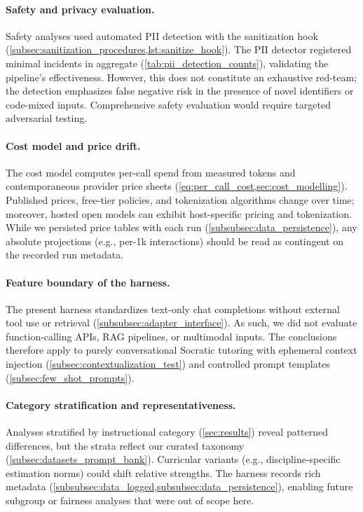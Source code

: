 \paragraph{Safety and privacy evaluation.} Safety analyses used automated PII detection with the sanitization hook (\cref{subsec:sanitization_procedures,lst:sanitize_hook}). The PII detector registered minimal incidents in aggregate (\cref{tab:pii_detection_counts}), validating the pipeline's effectiveness. However, this does not constitute an exhaustive red-team; the detection emphasizes false negative risk in the presence of novel identifiers or code-mixed inputs. Comprehensive safety evaluation would require targeted adversarial testing.

\paragraph{Cost model and price drift.} The cost model computes per-call spend from measured tokens and contemporaneous provider price sheets (\cref{eq:per_call_cost,sec:cost_modelling}). Published prices, free-tier policies, and tokenization algorithms change over time; moreover, hosted open models can exhibit host-specific pricing and tokenization. While we persisted price tables with each run (\cref{subsubsec:data_persistence}), any absolute projections (e.g., per-1k interactions) should be read as contingent on the recorded run metadata.

\paragraph{Feature boundary of the harness.} The present harness standardizes text-only chat completions without external tool use or retrieval (\cref{subsubsec:adapter_interface}). As such, we did not evaluate function-calling APIs, RAG pipelines, or multimodal inputs. The conclusions therefore apply to purely conversational Socratic tutoring with ephemeral context injection (\cref{subsec:contextualization_test}) and controlled prompt templates (\cref{subsec:few_shot_prompts}).

\paragraph{Category stratification and representativeness.} Analyses stratified by instructional category (\cref{sec:results}) reveal patterned differences, but the strata reflect our curated taxonomy (\cref{subsec:datasets_prompt_bank}). Curricular variants (e.g., discipline-specific estimation norms) could shift relative strengths. The harness records rich metadata (\cref{subsubsec:data_logged,subsubsec:data_persistence}), enabling future subgroup or fairness analyses that were out of scope here.

